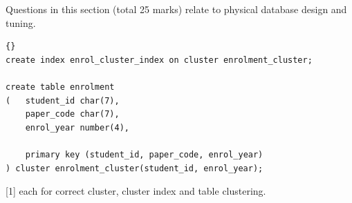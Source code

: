 \documentclass{ouexam}
\begin{document}
\begin{examsection}{25}{}{Questions in this section (total 25 marks) relate to
physical database design and tuning.}
\begin{question}{5}
\begin{subquestion}{3}
\begin{marking}
\begin{lstlisting}[language={[Oracle8]SQL}]{}
create index enrol_cluster_index on cluster enrolment_cluster;

create table enrolment
(	student_id char(7),
	paper_code char(7),
	enrol_year number(4),
  
	primary key (student_id, paper_code, enrol_year)
) cluster enrolment_cluster(student_id, enrol_year);
			\end{lstlisting}
		\end{marking}
		[1] each for correct cluster, cluster index and table clustering.
	\end{subquestion}

\end{question}


\end{examsection}


\newpage


\end{document}
